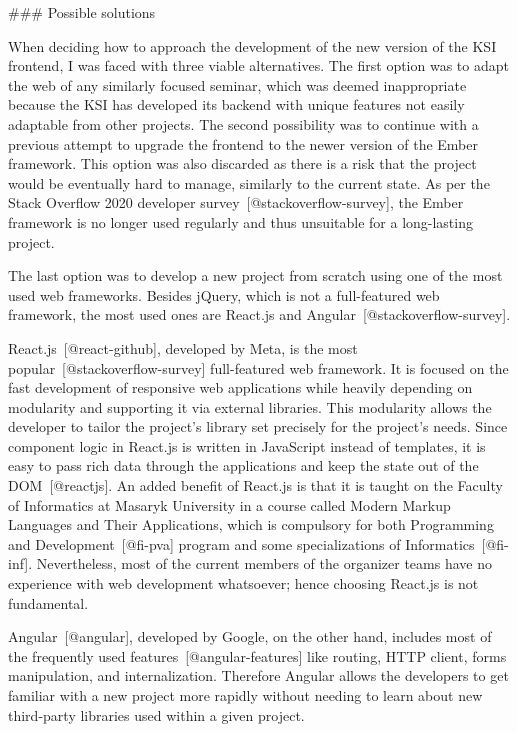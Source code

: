 \documentclass[
  digital, %
  oneside, %
  lof,     %
  nolot,     %
]{fithesis4}
\begin{document}
### Possible solutions

When deciding how to approach the development of the new version of the KSI frontend, I was faced with three viable alternatives. The first option was to adapt the web of any similarly focused seminar, which was deemed inappropriate because the KSI has developed its backend with unique features not easily adaptable from other projects. The second possibility was to continue with a previous attempt to upgrade the frontend to the newer version of the Ember framework. This option was also discarded as there is a risk that the project would be eventually hard to manage, similarly to the current state. As per the Stack Overflow 2020 developer survey~[@stackoverflow-survey], the Ember framework is no longer used regularly and thus unsuitable for a long-lasting project.

The last option was to develop a new project from scratch using one of the most used web frameworks. Besides jQuery, which is not a full-featured web framework, the most used ones are React.js and Angular~[@stackoverflow-survey].

React.js~[@react-github], developed by Meta, is the most popular~[@stackoverflow-survey] full-featured web framework. It is focused on the fast development of responsive web applications while heavily depending on modularity and supporting it via external libraries. This modularity allows the developer to tailor the project's library set precisely for the project's needs. Since component logic in React.js is written in JavaScript instead of templates, it is easy to pass rich data through the applications and keep the state out of the DOM~[@reactjs]. An added benefit of React.js is that it is taught on the Faculty of Informatics at Masaryk University in a course called Modern Markup Languages and Their Applications, which is compulsory for both
Programming and Development~[@fi-pva] program and some specializations of Informatics~[@fi-inf]. Nevertheless, most of the current members of the organizer teams have no experience with web development whatsoever; hence choosing React.js is not fundamental.

Angular~[@angular], developed by Google, on the other hand, includes most of the frequently used features~[@angular-features] like routing, HTTP client, forms manipulation, and internalization. Therefore Angular allows the developers to get familiar with a new project more rapidly without needing to learn about new third-party libraries used within a given project.
\end{document}

